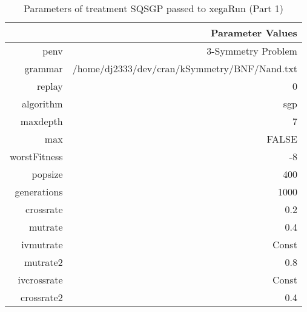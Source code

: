 \begin{table}[ht]
\centering
\begin{tabular}{rr}
  \hline
 & Parameter Values \\ 
  \hline
penv & 3-Symmetry Problem \\ 
  grammar & /home/dj2333/dev/cran/kSymmetry/BNF/Nand.txt \\ 
  replay & 0 \\ 
  algorithm & sgp \\ 
  maxdepth & 7 \\ 
  max & FALSE \\ 
  worstFitness & -8 \\ 
  popsize & 400 \\ 
  generations & 1000 \\ 
  crossrate & 0.2 \\ 
  mutrate & 0.4 \\ 
  ivmutrate & Const \\ 
  mutrate2 & 0.8 \\ 
  ivcrossrate & Const \\ 
  crossrate2 & 0.4 \\ 
   \hline
\end{tabular}
\caption{ Parameters of treatment SQSGP passed to xegaRun
 (Part 1)} 
\end{table}
